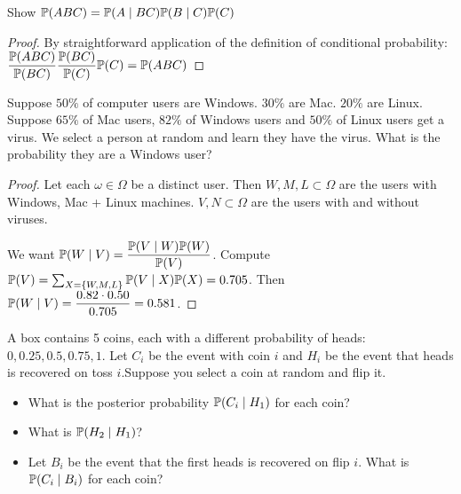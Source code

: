 \documentclass[10pt]{article}
\begin{document}
\setcounter{exercise}{16}
\begin{exercise}
    Show $\P(ABC) = \P(A \mid BC)\P(B \mid C)\P(C)$
\end{exercise}
\begin{proof}
    By straightforward application of the definition of conditional
    probability: $\dfrac{\P(ABC)}{\P(BC)}\dfrac{\P(BC)}{\P(C)}\P(C) = \P(ABC)$
\end{proof}


\setcounter{exercise}{18}
\begin{exercise}
    Suppose $50\%$ of computer users are Windows. $30\%$ are Mac. $20\%$ are
    Linux. Suppose $65\%$ of Mac users, $82\%$ of
    Windows users and $50\%$ of Linux users get a virus. We select a person at random and learn
    they have the virus. What is the probability they are a Windows user?
\end{exercise}
\begin{proof}

    Let each $\omega \in \Omega$ be a distinct user. Then $W, M, L \subset
    \Omega$ are the users with Windows, Mac + Linux machines. $V, N \subset
    \Omega$ are the users with and without viruses.

    We want $\P(W\mid V) = \dfrac{\P(V\mid W)\P(W)}{\P(V)}$. Compute
$\P(V) = \sum_{X = \{W, M, L\}} \P(V\mid X)\P(X) = 0.705$. Then $\P(W\mid
V)= \dfrac{0.82\cdot0.50}{0.705} = 0.581$.
\end{proof}

\setcounter{exercise}{19}
\begin{exercise}

    A box contains 5 coins, each with a different probability of heads: $0,
    0.25, 0.5, 0.75, 1$. Let $C_i$ be the event with coin $i$ and $H_i$ be the
    event that heads is recovered on toss $i$.Suppose you select a coin at random and flip it.

    \begin{itemize}
    \item{What is the posterior probability $\P(C_i \mid H_1)$ for each coin?}
    \item{What is $\P(H_2 \mid H_1)$?}
    \item{Let $B_i$ be the event that the first heads is recovered on flip $i$.
        What is $\P(C_i \mid B_i) $ for each coin?}
    \end{itemize}
\end{exercise}
\end{document}
